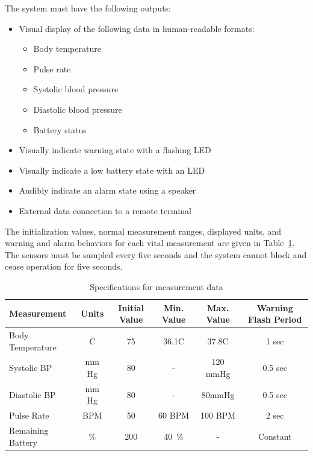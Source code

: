 \documentclass[12pt]{article} %
\begin{document}
\begin{itemize}[$$]
  \item The system must have the following outputs:
    \begin{itemize}[$\bullet$]
      \item Visual display of the following data in human-readable formats:
	\begin{itemize}
	  \item Body temperature
	  \item Pulse rate
	  \item Systolic blood pressure
	  \item Diastolic blood pressure
	  \item Battery status
	\end{itemize}
      \item Visually indicate warning state with a flashing LED
      \item Visually indicate a low battery state with an LED
      \item Audibly indicate an alarm state using a speaker
      \item External data connection to a remote terminal
    \end{itemize}
\end{itemize}

The initialization values, normal measurement ranges, displayed units, and 
warning and alarm behaviors for each vital measurement are given in 
Table~\ref{tab:sensorDefs}. The sensors must be sampled every five seconds and the system cannot block and cease operation for five seconds.

\begin{table}[h]
  \centering
  \begin{tabular}{|l|*{5}{c}|}
    \hline
    Measurement & Units & Initial Value & Min. Value & Max. Value & Warning Flash Period \\ \hline
    Body Temperature & C & 75 & 36.1C & 37.8C & 1 sec \\ \hline
    Systolic BP & mm Hg & 80 & - & 120 mmHg & 0.5 sec \\ \hline
    Diastolic BP & mm Hg & 80 & - & 80mmHg & 0.5 sec \\ \hline
    Pulse Rate & BPM & 50 & 60 BPM & 100 BPM & 2 sec \\ \hline
    Remaining Battery & \% & 200 & 40~\% & - & Constant \\ \hline
  \end{tabular}
  \caption{Specifications for measurement data}
  \label{tab:sensorDefs}
\end{table}
\end{document}
